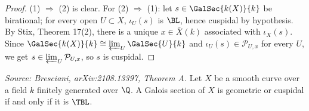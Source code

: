 \begin{proof}
  (1) \(\Rightarrow\) (2) is clear. For (2) \(\Rightarrow\) (1): let
  \(s \in \GalSec{k(X)}{k}\) be birational; for every open \(U \subset X\),
  \(\iota_U(s)\) is \(\BL\), hence cuspidal by hypothesis. By Stix, Theorem 17(2),
  there is a unique \(x \in \bar{X}(k)\) associated with \(\iota_X(s)\). Since
  \(\GalSec{k(X)}{k} \cong \varprojlim_U \GalSec{U}{k}\) and \(\iota_U(s) \in \mathcal{P}_{U,x}\)
  for every \(U\), we get \(s \in \varprojlim_U \mathcal{P}_{U,x}\), so \(s\) is
  cuspidal.
\end{proof}

\begin{theorem}[TheoremA]
  \label{thm:main-A}
  \textit{Source: Bresciani, arXiv:2108.13397, Theorem A.}
  Let \(X\) be a smooth curve over a field \(k\) finitely generated over \(\Q\). A
  Galois section of \(X\) is geometric or cuspidal if and only if it is \(\TBL\).
\end{theorem}

